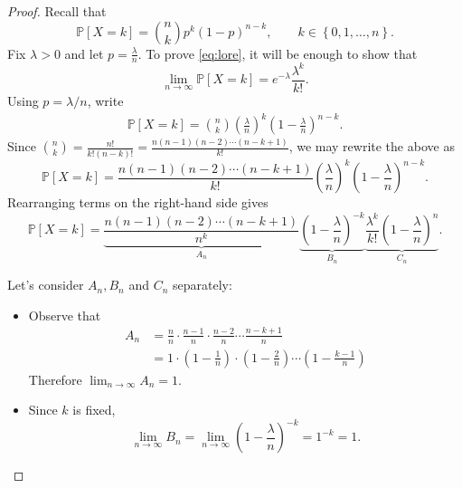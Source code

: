 \documentclass[10pt]{article}
\theoremstyle{definition}
\newcommand{\1}[1]{\textbf{1}_{\left[#1\right]}} %
\def\P{\mathbb{P}} %
\begin{document}
\begin{proof}
  Recall that
  \begin{equation*}
    \P\left[X=k \right] = {n\choose k}p^{k}(1-p)^{n-k}, \qquad k\in \left\{0,1,\ldots,n\right\}.
  \end{equation*}
  Fix $\lambda>0$ and let $p = \frac{\lambda}{n}$. To prove \cref{eq:lore}, it
  will be enough to show that
  \begin{equation}\label{eq:lore-wts}
    \lim_{n\to\infty} \P \left[ X=k \right] = e^{-\lambda}\frac{\lambda^{k}}{k!}.
  \end{equation}
  Using $p=\lambda/n$, write
  \begin{align*}
    \P\left[X=k \right] = {n\choose k}\left( \frac{\lambda}{n}\right)^{k}\left(1-\frac{\lambda}{n}\right)^{n-k}.
  \end{align*}
  Since ${n\choose k} = \frac{n!}{k!(n-k)!}=
  \frac{n(n-1)(n-2)\cdots(n-k+1)}{k!}$, we may rewrite the above as
  \begin{equation*}
    \P\left[X=k \right] = \frac{n(n-1)(n-2)\cdots(n-k+1)}{k!}\left( \frac{\lambda}{n}\right)^{k}\left(1-\frac{\lambda}{n}\right)^{n-k}. 
  \end{equation*}
  Rearranging terms on the right-hand side gives
  \begin{equation*}
    \P\left[ X=k \right] = \underbrace{\frac{n(n-1)(n-2)\cdots(n-k+1)}{n^{k}}}_{A_{n}}\underbrace{\left(1-\frac{\lambda}{n}\right)^{-k}}_{B_{n}}\underbrace{\frac{\lambda^{k}}{k!}\left(1-\frac{\lambda}{n}\right)^{n}}_{C_{n}}.
  \end{equation*}

  Let's consider $A_{n}, B_{n}$ and $C_{n}$ separately:

  \begin{itemize}
    \item Observe that
    \begin{align*}
      A_{n}
      &= \frac{n}{n}\cdot \frac{n-1}{n}\cdot \frac{n-2}{n}\cdots \frac{n-k+1}{n}\\
      &= 1\cdot \left( 1-\frac{1}{n} \right)\cdot\left( 1-\frac{2}{n} \right)\cdots \left( 1-\frac{k-1}{n} \right)   
    \end{align*}
    Therefore $\lim_{n\to\infty} A_{n}=1$.
    \item Since $k$ is fixed,
    \begin{equation*}
      \lim_{n\to\infty} B_{n}  = \lim_{n\to\infty} \left( 1-\frac{\lambda}{n} \right)^{-k} = 1^{-k} =1. 
    \end{equation*}
    

\end{itemize}
\end{proof}
\end{document}
